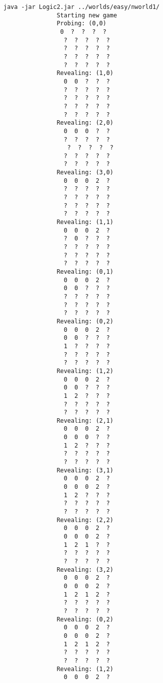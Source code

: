 \documentclass[british]{article}
\begin{document}
\begin{lstlisting}
java -jar Logic2.jar ../worlds/easy/nworld1/
               Starting new game
               Probing: (0,0)
                0  ?  ?  ?  ?
                 ?  ?  ?  ?  ?
                 ?  ?  ?  ?  ?
                 ?  ?  ?  ?  ?
                 ?  ?  ?  ?  ?
               Revealing: (1,0)
                 0  0  ?  ?  ?
                 ?  ?  ?  ?  ?
                 ?  ?  ?  ?  ?
                 ?  ?  ?  ?  ?
                 ?  ?  ?  ?  ?
               Revealing: (2,0)
                 0  0  0  ?  ?
                 ?  ?  ?  ?  ?
                  ?  ?  ?  ?  ?
                 ?  ?  ?  ?  ?
                 ?  ?  ?  ?  ?
               Revealing: (3,0)
                 0  0  0  2  ?
                 ?  ?  ?  ?  ?
                 ?  ?  ?  ?  ?
                 ?  ?  ?  ?  ?
                 ?  ?  ?  ?  ?
               Revealing: (1,1)
                 0  0  0  2  ?
                 ?  0  ?  ?  ?
                 ?  ?  ?  ?  ?
                 ?  ?  ?  ?  ?
                 ?  ?  ?  ?  ?
               Revealing: (0,1)
                 0  0  0  2  ?
                 0  0  ?  ?  ?
                 ?  ?  ?  ?  ?
                 ?  ?  ?  ?  ?
                 ?  ?  ?  ?  ?
               Revealing: (0,2)
                 0  0  0  2  ?
                 0  0  ?  ?  ?
                 1  ?  ?  ?  ?
                 ?  ?  ?  ?  ?
                 ?  ?  ?  ?  ?
               Revealing: (1,2)
                 0  0  0  2  ?
                 0  0  ?  ?  ?
                 1  2  ?  ?  ?
                 ?  ?  ?  ?  ?
                 ?  ?  ?  ?  ?
               Revealing: (2,1)
                 0  0  0  2  ?
                 0  0  0  ?  ?
                 1  2  ?  ?  ?
                 ?  ?  ?  ?  ?
                 ?  ?  ?  ?  ?
               Revealing: (3,1)
                 0  0  0  2  ?
                 0  0  0  2  ?
                 1  2  ?  ?  ?
                 ?  ?  ?  ?  ?
                 ?  ?  ?  ?  ?
               Revealing: (2,2)
                 0  0  0  2  ?
                 0  0  0  2  ?
                 1  2  1  ?  ?
                 ?  ?  ?  ?  ?
                 ?  ?  ?  ?  ?
               Revealing: (3,2)
                 0  0  0  2  ?
                 0  0  0  2  ?
                 1  2  1  2  ?
                 ?  ?  ?  ?  ?
                 ?  ?  ?  ?  ?
               Revealing: (0,2)
                 0  0  0  2  ?
                 0  0  0  2  ?
                 1  2  1  2  ?
                 ?  ?  ?  ?  ?
                 ?  ?  ?  ?  ?
               Revealing: (1,2)
                 0  0  0  2  ?

\end{lstlisting}
\end{document}
